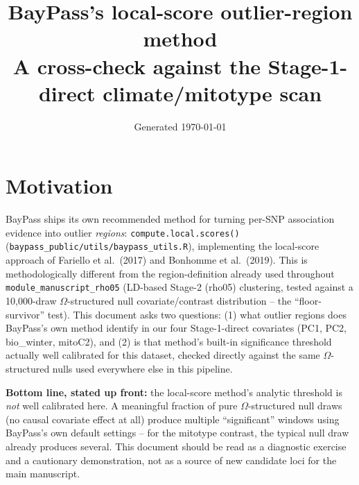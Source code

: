 \documentclass[11pt]{article}
\title{\vspace{-3em}\textbf{\color{Accent}BayPass's local-score outlier-region method}\\[0.2em]
\large A cross-check against the Stage-1-direct climate/mitotype scan}
\author{}
\date{\small Generated \today}
\begin{document}
\maketitle
\vspace{-2em}

\section*{\color{Accent}Motivation}
BayPass ships its own recommended method for turning per-SNP association evidence into
outlier \emph{regions}: \texttt{compute.local.scores()}
(\texttt{baypass\_public/utils/baypass\_utils.R}), implementing the local-score approach of
Fariello et al.\ (2017) and Bonhomme et al.\ (2019). This is methodologically different from the
region-definition already used throughout \texttt{module\_manuscript\_rho05} (LD-based Stage-2
(rho05) clustering, tested against a 10{,}000-draw $\Omega$-structured null covariate/contrast
distribution -- the ``floor-survivor'' test). This document asks two questions: (1) what
outlier regions does BayPass's own method identify in our four Stage-1-direct covariates
(PC1, PC2, bio\_winter, mitoC2), and (2) is that method's built-in significance threshold
actually well calibrated for this dataset, checked directly against the same
$\Omega$-structured nulls used everywhere else in this pipeline.

\textbf{Bottom line, stated up front:} the local-score method's analytic threshold is
\emph{not} well calibrated here. A meaningful fraction of pure $\Omega$-structured null draws
(no causal covariate effect at all) produce multiple ``significant'' windows using BayPass's
own default settings -- for the mitotype contrast, the typical null draw already produces
several. This document should be read as a diagnostic exercise and a cautionary
demonstration, not as a source of new candidate loci for the main manuscript.
\end{document}
